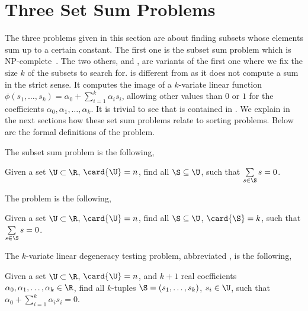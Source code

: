 
\section{Three Set Sum Problems}

The three problems given in this section are about finding subsets whose
elements sum up to a certain constant. The first one is the subset sum problem
which is NP-complete~\cite{karp:1972}. The two others, \kSUM and \kLDT, are
variants of the first one where we fix the size $k$ of the subsets to search
for. \kLDT is different from \kSUM as it does not compute a sum in the
strict sense.  It computes the image of a $k$-variate linear function
$\phi(s_1, \ldots, s_k) = \alpha_0 + \sum_{i=1}^{k} \alpha_i s_i$, allowing
other values than $0$ or $1$ for the coefficients $\alpha_0, \alpha_1, \ldots,
\alpha_k$. It is trivial to see that \kSUM is contained in \kLDT. We
explain in the next sections how these set sum problems relate to sorting
problems. Below are the formal definitions of the problem.

The subset sum problem is the following,

\begin{problem}
Given a set $\U \subset \R$, $\card{\U} = n$, find all
$\S \subseteq \U$, such that $\sum\limits_{s \in \S} s = 0$.
\end{problem}


The \kSUM problem is the following,

\begin{problem}
Given a set $\U \subset \R$, $\card{\U} = n$, find all
$\S \subseteq \U$, $\card{\S} = k$, such that $\sum\limits_{s
\in \S} s = 0$.
\end{problem}


The $k$-variate linear degeneracy testing problem, abbreviated \kLDT, is the
following,

\begin{problem}
Given a set $\U \subset \R$, $\card{\U} = n$, and $k+1$ real
coefficients $\alpha_0, \alpha_1, \ldots, \alpha_k \in \R$, find all $k$-tuples
$\S = (s_1, \ldots, s_k)$, $s_i \in \U$, such that
$\alpha_0 + \sum_{i=1}^{k} \alpha_i s_i = 0$.
\end{problem}
